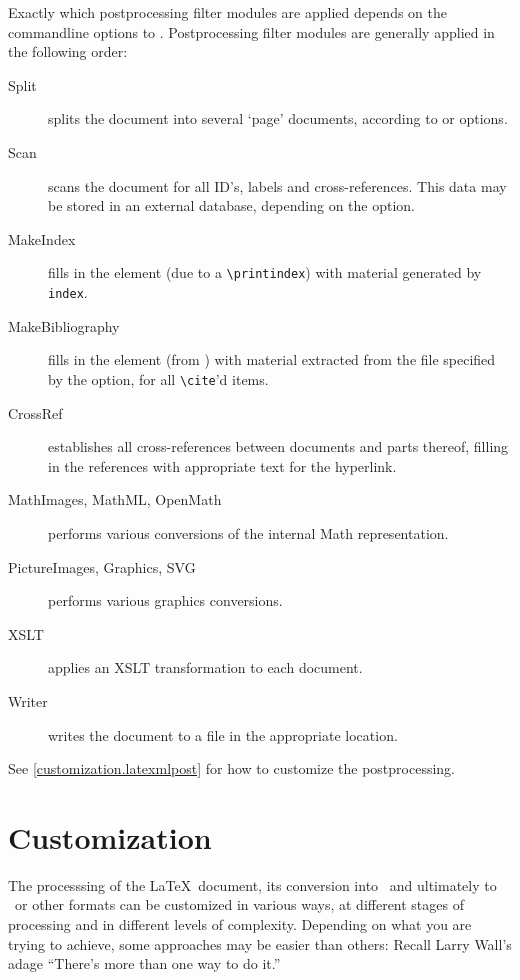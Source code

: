 \documentclass{book}
\begin{document}
Exactly which postprocessing filter modules are applied depends
on the commandline options to .
Postprocessing filter modules are generally applied in the following order:
\begin{description}
  \item[Split] splits the document into several `page' documents,
   according to  or  options.
  \item[Scan] scans the document for all ID's, labels and cross-references.
    This data may be stored in an external database,  depending on the  option.
  \item[MakeIndex] fills in the  element (due to a \verb|\printindex|)
   with material generated by \verb|index|.
  \item[MakeBibliography] fills in the  element
   (from \verb||) with material extracted from the
   file specified by the  option, for all \verb|\cite|'d items.
  \item[CrossRef] establishes all cross-references between documents and
   parts thereof, filling in the references with appropriate text for the hyperlink.
  \item[MathImages, MathML, OpenMath] performs various conversions of the
   internal Math representation.
  \item[PictureImages, Graphics, SVG] performs various graphics conversions.
  \item[XSLT] applies an XSLT transformation to each document.
  \item[Writer] writes the document to a file in the appropriate location.
\end{description}
See \ref{customization.latexmlpost} for how to customize the postprocessing.

\chapter{Customization}\label{customization}
The processsing of the \LaTeX\ document, its  conversion into \XML\ and ultimately
to \XHTML\ or other formats can be customized in various ways, at
different stages of processing and in different levels of complexity.
Depending on what you are trying to achieve, some approaches may be easier
than others: Recall Larry Wall's adage ``There's more than one way to do it.''
\end{document}
